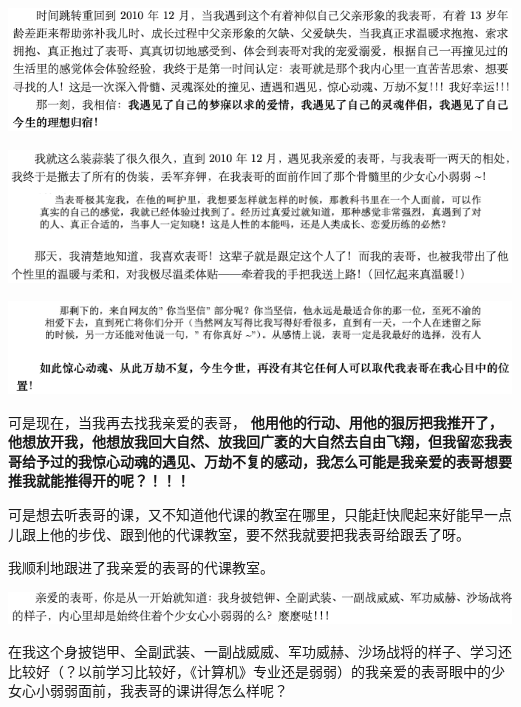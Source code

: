\documentclass[9pt, b5paper]{article}
\begin{document}
\begin{center}
\includegraphics[width=.9\linewidth]{./pic/backups_plans_20210506_204240.png}
\end{center}

\begin{center}
\includegraphics[width=.9\linewidth]{./pic/backups_plans_20210506_204559.png}
\end{center}

\begin{center}
\includegraphics[width=.9\linewidth]{./pic/backups_plans_20210506_204657.png}
\end{center}

可是现在，当我再去找我亲爱的表哥， \textbf{他用他的行动、用他的狠厉把我推开了，他想放开我，他想放我回大自然、放我回广袤的大自然去自由飞翔，但我留恋我表哥给予过的我惊心动魂的遇见、万劫不复的感动，我怎么可能是我亲爱的表哥想要推我就能推得开的呢？！！！}

可是想去听表哥的课，又不知道他代课的教室在哪里，只能赶快爬起来好能早一点儿跟上他的步伐、跟到他的代课教室，要不然我就要把我表哥给跟丢了呀。

我顺利地跟进了我亲爱的表哥的代课教室。

\begin{center}
\includegraphics[width=.9\linewidth]{./pic/backups_plans_20210506_114236.png}
\end{center}

在我这个身披铠甲、全副武装、一副战威威、军功威赫、沙场战将的样子、学习还比较好（？以前学习比较好，《计算机》专业还是弱弱）的我亲爱的表哥眼中的少女心小弱弱面前，我表哥的课讲得怎么样呢？
\end{document}

